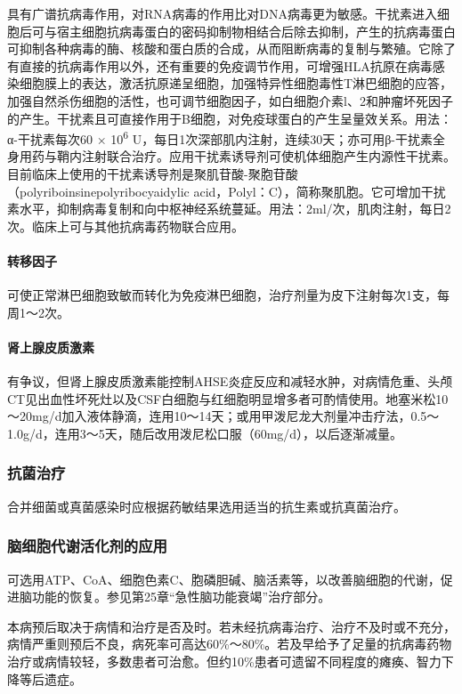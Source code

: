 具有广谱抗病毒作用，对RNA病毒的作用比对DNA病毒更为敏感。干扰素进入细胞后可与宿主细胞抗病毒蛋白的密码抑制物相结合后除去抑制，产生的抗病毒蛋白可抑制各种病毒的酶、核酸和蛋白质的合成，从而阻断病毒的复制与繁殖。它除了有直接的抗病毒作用以外，还有重要的免疫调节作用，可增强HLA抗原在病毒感染细胞膜上的表达，激活抗原递呈细胞，加强特异性细胞毒性T淋巴细胞的应答，加强自然杀伤细胞的活性，也可调节细胞因子，如白细胞介素l、2和肿瘤坏死因子的产生。干扰素且可直接作用于B细胞，对免疫球蛋白的产生呈量效关系。用法：α-干扰素每次60
× 10\textsuperscript{6}
U，每日1次深部肌内注射，连续30天；亦可用β-干扰素全身用药与鞘内注射联合治疗。应用干扰素诱导剂可使机体细胞产生内源性干扰素。目前临床上使用的干扰素诱导剂是聚肌苷酸-聚胞苷酸（polyriboinsinepolyribocyaidylic
acid，Polyl：C），简称聚肌胞。它可增加干扰素水平，抑制病毒复制和向中枢神经系统蔓延。用法：2ml/次，肌肉注射，每日2次。临床上可与其他抗病毒药物联合应用。

\paragraph{转移因子}

可使正常淋巴细胞致敏而转化为免疫淋巴细胞，治疗剂量为皮下注射每次1支，每周1～2次。

\paragraph{肾上腺皮质激素}

有争议，但肾上腺皮质激素能控制AHSE炎症反应和减轻水肿，对病情危重、头颅CT见出血性坏死灶以及CSF白细胞与红细胞明显增多者可酌情使用。地塞米松10～20mg/d加入液体静滴，连用10～14天；或用甲泼尼龙大剂量冲击疗法，0.5～1.0g/d，连用3～5天，随后改用泼尼松口服（60mg/d），以后逐渐减量。

\subsubsection{抗菌治疗}

合并细菌或真菌感染时应根据药敏结果选用适当的抗生素或抗真菌治疗。

\subsubsection{脑细胞代谢活化剂的应用}

可选用ATP、CoA、细胞色素C、胞磷胆碱、脑活素等，以改善脑细胞的代谢，促进脑功能的恢复。参见第25章“急性脑功能衰竭”治疗部分。

本病预后取决于病情和治疗是否及时。若未经抗病毒治疗、治疗不及时或不充分，病情严重则预后不良，病死率可高达60\%～80\%。若及早给予了足量的抗病毒药物治疗或病情较轻，多数患者可治愈。但约10\%患者可遗留不同程度的瘫痪、智力下降等后遗症。

